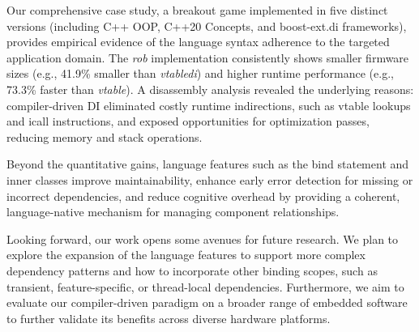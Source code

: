 \documentclass[10pt,sigplan,screen,anonymous]{acmart}
\begin{document}
Our comprehensive case study, a breakout game implemented in five distinct versions (including C++ OOP, C++20 Concepts, and boost-ext.di frameworks), provides empirical evidence of the language syntax adherence to the targeted application domain. The \emph{rob} implementation consistently shows smaller firmware sizes (e.g., 41.9\% smaller than \emph{vtabledi}) and higher runtime performance (e.g., 73.3\% faster than \emph{vtable}). A disassembly analysis revealed the underlying reasons: compiler-driven DI eliminated costly runtime indirections, such as vtable lookups and icall instructions, and exposed opportunities for optimization passes, reducing memory and stack operations. 

Beyond the quantitative gains, language features such as the bind statement and inner classes improve maintainability, enhance early error detection for missing or incorrect dependencies, and reduce cognitive overhead by providing a coherent, language-native mechanism for managing component relationships.

Looking forward, our work opens some avenues for future research. We plan to explore the expansion of the language features to support more complex dependency patterns and how to incorporate other binding scopes, such as transient, feature-specific, or thread-local dependencies. Furthermore, we aim to evaluate our compiler-driven paradigm on a broader range of embedded software to further validate its benefits across diverse hardware platforms.



\end{document}
